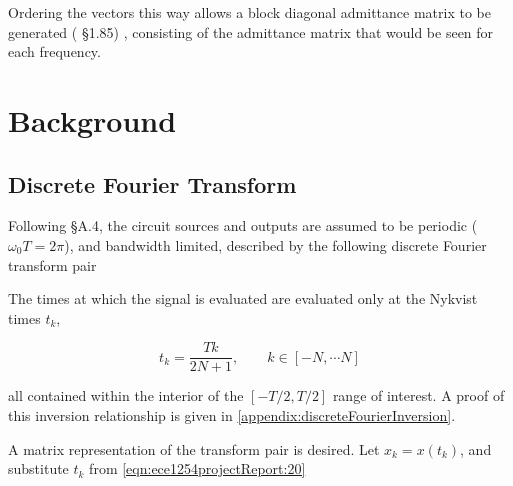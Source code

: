 \documentclass[12pt,journal,compsoc]{../ieeepaper/IEEEtran}
\begin{document}
Ordering the vectors this way allows a block diagonal admittance matrix to be generated (\citep{giannini2004NonlinearMicrowaveCircuitDesign}
 \S 1.85)
, consisting of the admittance matrix that would be seen for each frequency.


%
% 

\section{Background}
\subsection{Discrete Fourier Transform}

Following \citep{giannini2004NonlinearMicrowaveCircuitDesign} \S A.4, the circuit sources and outputs are assumed to be periodic (\( \omega_0 T = 2 \pi \)), and bandwidth limited, described by the following discrete Fourier transform pair


The times at which the signal is evaluated are evaluated only at the Nykvist times 
\( t_k \), 

\begin{equation}\label{eqn:ece1254projectReport:20}
t_k = \frac{T k}{2 N + 1}, \qquad k \in [-N, \cdots N]
\end{equation}

all contained within the interior of the \( [-T/2, T/2] \) range of interest.  
A proof of this inversion relationship is given in \cref{appendix:discreteFourierInversion}.

A matrix representation of the transform pair is desired.  
Let \( x_k = x(t_k) \), and 
substitute \( t_k \) from \cref{eqn:ece1254projectReport:20}
\end{document}
